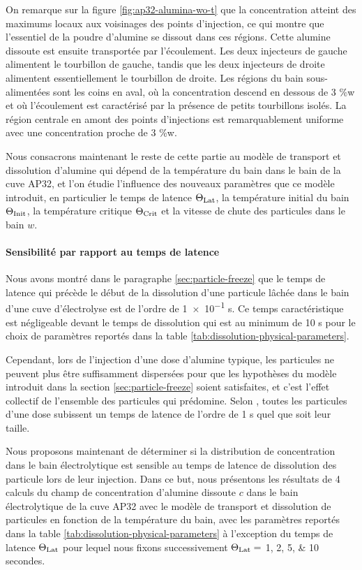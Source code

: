 On remarque sur la figure \ref{fig:ap32-alumina-wo-t} que la
concentration atteint des maximums locaux aux voisinages des points
d'injection, ce qui montre que l'essentiel de la poudre d'alumine se
dissout dans ces régions. Cette alumine dissoute est ensuite
transportée par l'écoulement. Les deux injecteurs de gauche alimentent
le tourbillon de gauche, tandis que les deux injecteurs de droite
alimentent essentiellement le tourbillon de droite. Les régions du bain
sous-alimentées sont les coins en aval, où la concentration descend
en dessous de \num{3} \%w et où l'écoulement est
caractérisé par la présence de petits tourbillons isolés. La région
centrale en amont des points d'injections est remarquablement uniforme
avec une concentration proche de \num{3} \%w.


Nous consacrons maintenant le reste de cette partie au
modèle de transport et dissolution d'alumine qui dépend de la
température du bain dans le bain de la cuve AP32, et l'on étudie
l'influence des nouveaux paramètres que ce modèle introduit,
en particulier le temps de latence $\Theta_\text{Lat}$, la température initial du
bain $\Theta_\text{Init}$, la température critique $\Theta_\text{Crit}$ et la vitesse de
chute des particules dans le bain $w$.


\paragraph{Sensibilité par rapport au temps de latence}
Nous avons montré dans le paragraphe \ref{sec:particle-freeze} que le
temps de latence qui précède le début de la dissolution d'une
particule lâchée dans le bain d'une cuve d'électrolyse est de l'ordre
de \num{1e-1} \si{\second}. Ce temps caractéristique est
négligeable devant le temps de dissolution qui est au minimum de
\num{10} \si{\second} pour le choix de paramètres reportés dans la
table \ref{tab:dissolution-physical-parameters}.

Cependant, lors de l'injection d'une dose d'alumine typique, les
particules ne peuvent plus être suffisamment dispersées pour que
les hypothèses du modèle introduit dans la section
\ref{sec:particle-freeze} soient satisfaites, et c'est l'effet
collectif de l'ensemble des particules qui prédomine. Selon
\cite{Dassylva2015}, toutes les particules d'une dose subissent un
temps de latence de l'ordre de \num{1} \si{\second} quel que soit leur
taille.

Nous proposons maintenant de déterminer si la distribution de
concentration dans le bain électrolytique est sensible au temps de
latence de dissolution des particule lors de leur injection. Dans ce
but, nous présentons les résultats de 4 calculs du champ de
concentration d'alumine dissoute $c$ dans le bain électrolytique de
la cuve AP32 avec le modèle de transport et dissolution de
particules en fonction de la température du bain, avec les
paramètres reportés dans la table
\ref{tab:dissolution-physical-parameters} à l'exception du temps de
latence $\Theta_\text{Lat}$ pour lequel nous fixons successivement $\Theta_\text{Lat} = $
\numlist{1;2;5;10} secondes.

